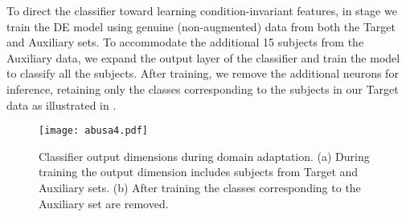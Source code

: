 To direct the classifier toward learning condition-invariant features, in stage \uppercase\expandafter{} we train the DE model using genuine (non-augmented) data from both the Target and Auxiliary sets.
To accommodate the additional 15 subjects from the Auxiliary data, we expand the output layer of the classifier and train the model to classify all the subjects.
After training, we remove the additional neurons for inference, retaining only the classes corresponding to the subjects in our Target data as illustrated in .
\begin{figure}[!t]
    \centering
    \texttt{[image: abusa4.pdf]}
    \caption{Classifier output dimensions during domain adaptation. (a) During training the output dimension includes subjects from Target and Auxiliary sets. (b) After training the classes corresponding to the Auxiliary set are removed.}
    \label{fig:domain_adaptation_clf}
\end{figure}
